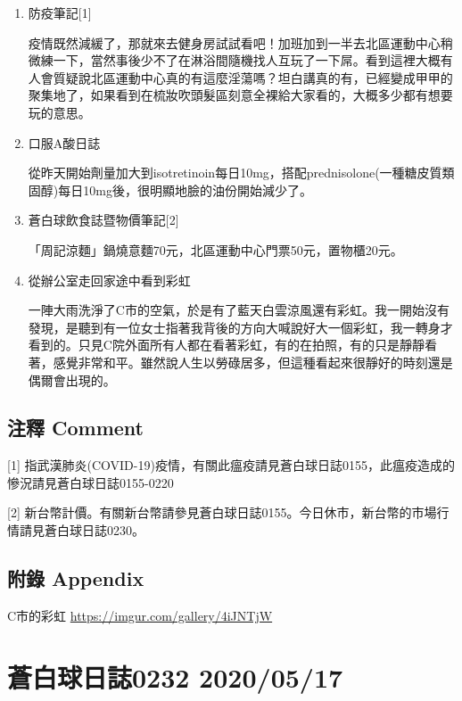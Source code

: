 \documentclass[a5paper, 12pt
]{book}
\begin{document}
\begin{enumerate}
\def\labelenumi{\arabic{enumi}.}
\item
  防疫筆記{[}1{]}

  疫情既然減緩了，那就來去健身房試試看吧！加班加到一半去北區運動中心稍微練一下，當然事後少不了在淋浴間隨機找人互玩了一下屌。看到這裡大概有人會質疑說北區運動中心真的有這麼淫蕩嗎？坦白講真的有，已經變成甲甲的聚集地了，如果看到在梳妝吹頭髮區刻意全裸給大家看的，大概多少都有想要玩的意思。
\item
  口服A酸日誌

  從昨天開始劑量加大到isotretinoin每日10mg，搭配prednisolone(一種糖皮質類固醇)每日10mg後，很明顯地臉的油份開始減少了。
\item
  蒼白球飲食誌暨物價筆記{[}2{]}

  「周記涼麵」鍋燒意麵70元，北區運動中心門票50元，置物櫃20元。
\item
  從辦公室走回家途中看到彩虹

  一陣大雨洗淨了C市的空氣，於是有了藍天白雲涼風還有彩虹。我一開始沒有發現，是聽到有一位女士指著我背後的方向大喊說好大一個彩虹，我一轉身才看到的。只見C院外面所有人都在看著彩虹，有的在拍照，有的只是靜靜看著，感覺非常和平。雖然說人生以勞碌居多，但這種看起來很靜好的時刻還是偶爾會出現的。
\end{enumerate}

\hypertarget{ux6ce8ux91cb-comment-76}{%
\subsection{注釋 Comment}\label{ux6ce8ux91cb-comment-76}}

{[}1{]}
指武漢肺炎(COVID-19)疫情，有關此瘟疫請見蒼白球日誌0155，此瘟疫造成的慘況請見蒼白球日誌0155-0220

{[}2{]}
新台幣計價。有關新台幣請參見蒼白球日誌0155。今日休市，新台幣的市場行情請見蒼白球日誌0230。

\hypertarget{ux9644ux9304-appendix-76}{%
\subsection{附錄 Appendix}\label{ux9644ux9304-appendix-76}}

C市的彩虹 \url{https://imgur.com/gallery/4iJNTjW}

\hypertarget{ux84bcux767dux7403ux65e5ux8a8c0232-20200517}{%
\section{蒼白球日誌0232
2020/05/17}\label{ux84bcux767dux7403ux65e5ux8a8c0232-20200517}}
\end{document}
